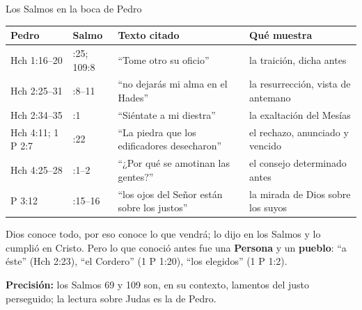 \documentclass[hyperref={bookmarks=false},aspectratio=169]{beamer}
\newcommand{\destacar}[1]{\textbf{\textcolor{azul}{#1}}}
\newcommand{\precision}[1]{{\footnotesize\color{gris}\textbf{Precisión:} #1}}
\begin{document}
\begin{frame}{Los Salmos en la boca de Pedro}
\scriptsize\renewcommand{\arraystretch}{1.12}
\begin{tabular}{@{}>{\RaggedRight\arraybackslash}p{2.0cm}>{\RaggedRight\arraybackslash}p{2.0cm}>{\RaggedRight\arraybackslash}p{4.0cm}>{\RaggedRight\arraybackslash}p{3.8cm}@{}}
\toprule
\textbf{Pedro} & \textbf{Salmo} & \textbf{Texto citado} & \textbf{Qué muestra} \\ \midrule
Hch 1:16--20 & 69:25; 109:8 & ``Tome otro su oficio'' & la traición, dicha antes \\
Hch 2:25--31 & 16:8--11 & ``no dejarás mi alma en el Hades'' & la resurrección, vista de antemano \\
Hch 2:34--35 & 110:1 & ``Siéntate a mi diestra'' & la exaltación del Mesías \\
Hch 4:11; 1 P 2:7 & 118:22 & ``La piedra que los edificadores desecharon'' & el rechazo, anunciado y vencido \\
Hch 4:25--28 & 2:1--2 & ``¿Por qué se amotinan las gentes?'' & el consejo determinado antes \\
1 P 3:12 & 34:15--16 & ``los ojos del Señor están sobre los justos'' & la mirada de Dios sobre los suyos \\
\bottomrule
\end{tabular}\par\medskip
\small\RaggedRight Dios conoce todo, por eso conoce lo que vendrá; lo dijo en los Salmos y lo cumplió en Cristo. Pero lo que conoció antes fue una \destacar{Persona} y un \destacar{pueblo}: ``a éste'' (Hch 2:23), ``el Cordero'' (1 P 1:20), ``los elegidos'' (1 P 1:2).\par\smallskip
\precision{los Salmos 69 y 109 son, en su contexto, lamentos del justo perseguido; la lectura sobre Judas es la de Pedro.}
\end{frame}
\end{document}
